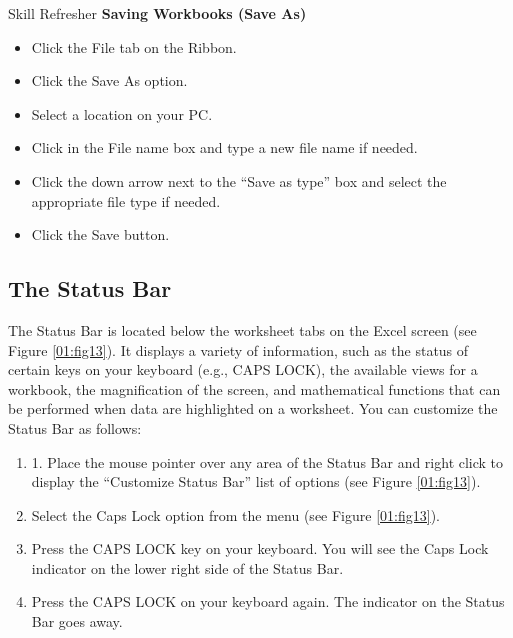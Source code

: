 \begin{center}
	\begin{sklbox}{Skill Refresher}
		\textbf{Saving Workbooks (Save As)}
		\\
		\begin{itemize}
			\setlength{\itemsep}{0pt}
			\setlength{\parskip}{0pt}
			\setlength{\parsep}{0pt}
			
			\item Click the File tab on the Ribbon.
			\item Click the Save As option.
			\item Select a location on your PC.
			\item Click in the File name box and type a new file name if needed.
			\item Click the down arrow next to the ``Save as type'' box and select the appropriate file type if needed.
			\item Click the Save button.
		
		\end{itemize}
	\end{sklbox}
\end{center}

\subsection{The Status Bar}

The Status Bar is located below the worksheet tabs on the Excel screen (see Figure \ref{01:fig13}). It displays a variety of information, such as the status of certain keys on your keyboard (e.g., CAPS LOCK), the available views for a workbook, the magnification of the screen, and mathematical functions that can be performed when data are highlighted on a worksheet. You can customize the Status Bar as follows:

\begin{enumerate}
	\item 1. Place the mouse pointer over any area of the Status Bar and right click to display the ``Customize Status Bar'' list of options (see Figure \ref{01:fig13}).
	\item Select the Caps Lock option from the menu (see Figure \ref{01:fig13}).
	\item Press the CAPS LOCK key on your keyboard. You will see the Caps Lock indicator on the lower right side of the Status Bar.
	\item Press the CAPS LOCK on your keyboard again. The indicator on the Status Bar goes away.
\end{enumerate}

